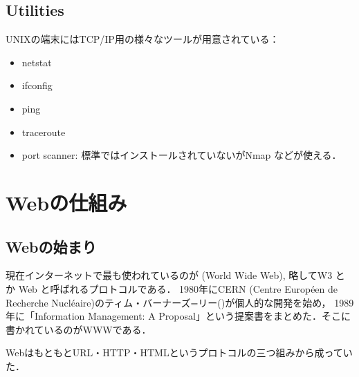 \subsection{Utilities}
UNIXの端末にはTCP/IP用の様々なツールが用意されている：
\begin{itemize}
   \item 
      netstat 
   \item    
      ifconfig
   \item 
      ping
   \item 
      traceroute 
    \item 
      port scanner: 標準ではインストールされていないがNmap などが使える．
\end{itemize}


%
%
%

\section{Webの仕組み}
\subsection{Webの始まり}
現在インターネットで最も使われているのが
(World Wide Web), 略してW3 とか Web と呼ばれるプロトコルである．
1980年にCERN (Centre Europ\' een de Recherche Nucl\' eaire)のティム・バーナーズ=リー(\cite{LT})が個人的な開発を始め， 
1989年に「Information Management: A Proposal」という提案書をまとめた．そこに書かれているのがWWWである．

WebはもともとURL・HTTP・HTMLというプロトコルの三つ組みから成っていた．

